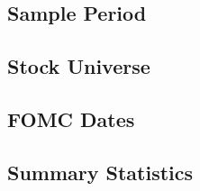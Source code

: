 
\subsection{Sample Period}

\subsection{Stock Universe}

\subsection{FOMC Dates}

\subsection{Summary Statistics}



